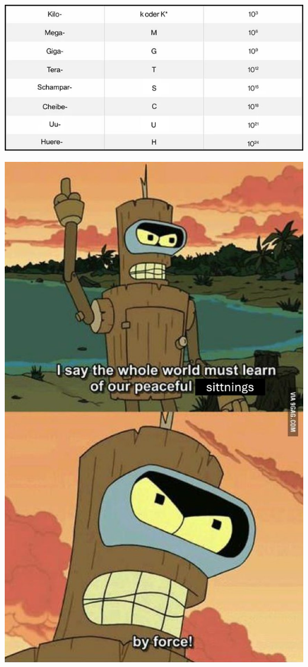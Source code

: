 \documentclass{article}
\begin{document}
\includegraphics[width=0.9\linewidth]{images/memes/huere.jpg}

\newpage
\begin{center}
\vspace*{15em}
\includegraphics[width=\linewidth]{images/memes/bender.jpg}
\end{center}
\vfill
\license
\end{document}
